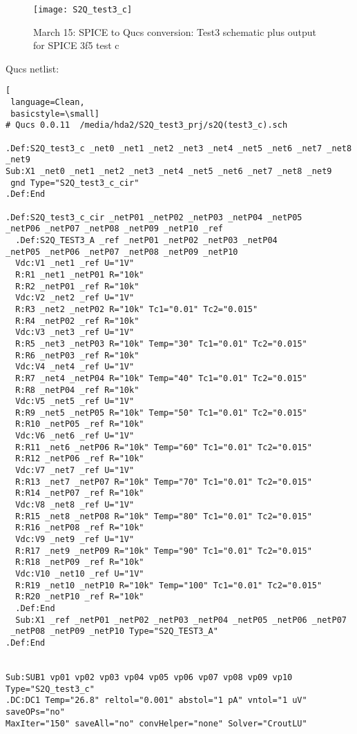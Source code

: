 \newpage 
\begin{figure}
  \centering
  \texttt{[image: S2Q\_test3\_c]}
  \caption{March 15: SPICE to Qucs conversion: Test3 schematic plus output for SPICE 3f5 test c} 
  \label{fig:S2Qtest3_2}
\end{figure} 


Qucs netlist:
\begin{lstlisting}[
 language=Clean, 
 basicstyle=\small]
# Qucs 0.0.11  /media/hda2/S2Q_test3_prj/s2Q(test3_c).sch

.Def:S2Q_test3_c _net0 _net1 _net2 _net3 _net4 _net5 _net6 _net7 _net8 _net9
Sub:X1 _net0 _net1 _net2 _net3 _net4 _net5 _net6 _net7 _net8 _net9
 gnd Type="S2Q_test3_c_cir"
.Def:End

.Def:S2Q_test3_c_cir _netP01 _netP02 _netP03 _netP04 _netP05 
_netP06 _netP07 _netP08 _netP09 _netP10 _ref
  .Def:S2Q_TEST3_A _ref _netP01 _netP02 _netP03 _netP04 
_netP05 _netP06 _netP07 _netP08 _netP09 _netP10
  Vdc:V1 _net1 _ref U="1V"
  R:R1 _net1 _netP01 R="10k"
  R:R2 _netP01 _ref R="10k"
  Vdc:V2 _net2 _ref U="1V"
  R:R3 _net2 _netP02 R="10k" Tc1="0.01" Tc2="0.015"
  R:R4 _netP02 _ref R="10k"
  Vdc:V3 _net3 _ref U="1V"
  R:R5 _net3 _netP03 R="10k" Temp="30" Tc1="0.01" Tc2="0.015"
  R:R6 _netP03 _ref R="10k"
  Vdc:V4 _net4 _ref U="1V"
  R:R7 _net4 _netP04 R="10k" Temp="40" Tc1="0.01" Tc2="0.015"
  R:R8 _netP04 _ref R="10k"
  Vdc:V5 _net5 _ref U="1V"
  R:R9 _net5 _netP05 R="10k" Temp="50" Tc1="0.01" Tc2="0.015"
  R:R10 _netP05 _ref R="10k"
  Vdc:V6 _net6 _ref U="1V"
  R:R11 _net6 _netP06 R="10k" Temp="60" Tc1="0.01" Tc2="0.015"
  R:R12 _netP06 _ref R="10k"
  Vdc:V7 _net7 _ref U="1V"
  R:R13 _net7 _netP07 R="10k" Temp="70" Tc1="0.01" Tc2="0.015"
  R:R14 _netP07 _ref R="10k"
  Vdc:V8 _net8 _ref U="1V"
  R:R15 _net8 _netP08 R="10k" Temp="80" Tc1="0.01" Tc2="0.015"
  R:R16 _netP08 _ref R="10k"
  Vdc:V9 _net9 _ref U="1V"
  R:R17 _net9 _netP09 R="10k" Temp="90" Tc1="0.01" Tc2="0.015"
  R:R18 _netP09 _ref R="10k"
  Vdc:V10 _net10 _ref U="1V"
  R:R19 _net10 _netP10 R="10k" Temp="100" Tc1="0.01" Tc2="0.015"
  R:R20 _netP10 _ref R="10k"
  .Def:End 
  Sub:X1 _ref _netP01 _netP02 _netP03 _netP04 _netP05 _netP06 _netP07
 _netP08 _netP09 _netP10 Type="S2Q_TEST3_A"
.Def:End


Sub:SUB1 vp01 vp02 vp03 vp04 vp05 vp06 vp07 vp08 vp09 vp10 Type="S2Q_test3_c"
.DC:DC1 Temp="26.8" reltol="0.001" abstol="1 pA" vntol="1 uV" saveOPs="no" 
MaxIter="150" saveAll="no" convHelper="none" Solver="CroutLU"


\end{lstlisting}


